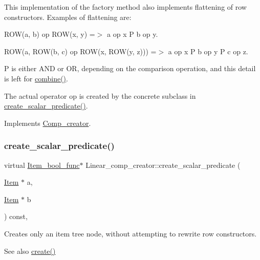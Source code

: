 This implementation of the factory method also implements flattening of row constructors. Examples of flattening are\+:


\begin{DoxyItemize}
\item R\+O\+W(a, b) op R\+O\+W(x, y) =$>$ a op x P b op y.
\item R\+OW(a, R\+O\+W(b, c) op R\+O\+W(x, R\+O\+W(y, z))) =$>$ a op x P b op y P c op z.
\end{DoxyItemize}

P is either A\+ND or OR, depending on the comparison operation, and this detail is left for \mbox{\hyperlink{classLinear__comp__creator_a66edcc06bc8ae10b62769b0656a3adf4}{combine()}}.

The actual operator  op is created by the concrete subclass in \mbox{\hyperlink{classLinear__comp__creator_ad77c92f078a60d9026d394fa55d80a49}{create\+\_\+scalar\+\_\+predicate()}}. 

Implements \mbox{\hyperlink{classComp__creator}{Comp\+\_\+creator}}.

\mbox{\label{classLinear__comp__creator_ad77c92f078a60d9026d394fa55d80a49}} 
\subsubsection{\texorpdfstring{create\+\_\+scalar\+\_\+predicate()}{create\_scalar\_predicate()}}
{\footnotesize\ttfamily virtual \mbox{\hyperlink{classItem__bool__func}{Item\+\_\+bool\+\_\+func}}$\ast$ Linear\+\_\+comp\+\_\+creator\+::create\+\_\+scalar\+\_\+predicate (\begin{DoxyParamCaption}\item[{\mbox{\hyperlink{classItem}{Item}} $\ast$}]{a,  }\item[{\mbox{\hyperlink{classItem}{Item}} $\ast$}]{b }\end{DoxyParamCaption}) const\hspace{0.3cm}{\ttfamily [protected]}, {}}

Creates only an item tree node, without attempting to rewrite row constructors. \begin{DoxySeeAlso}{See also}
\mbox{\hyperlink{classLinear__comp__creator_abf8d17944a06f0f90a187f4d99e06319}{create()}} 
\end{DoxySeeAlso}


